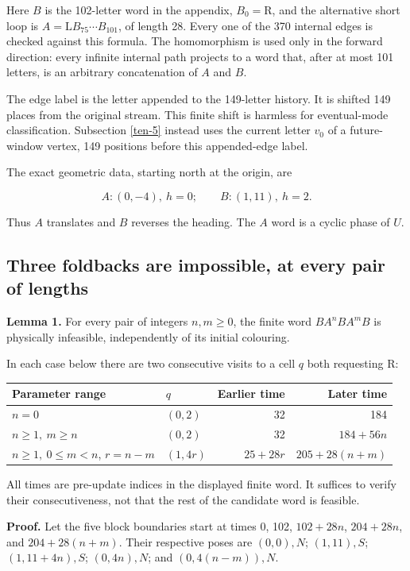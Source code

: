 \documentclass[
  11pt,
]{article}
\begin{document}
Here \(B\) is the 102-letter word in the appendix, \(B_0=\mathrm R\),
and the alternative short loop is \(A=\mathrm L B_{75}\cdots B_{101}\),
of length 28. Every one of the 370 internal edges is checked against
this formula. The homomorphism is used only in the forward direction:
every infinite internal path projects to a word that, after at most 101
letters, is an arbitrary concatenation of \(A\) and \(B\).

The edge label is the letter appended to the 149-letter history. It is
shifted 149 places from the original stream. This finite shift is
harmless for eventual-mode classification. Subsection \ref{ten-5}
instead uses the current letter \(v_0\) of a future-window vertex,
149 positions before this appended-edge label.

The exact geometric data, starting north at the origin, are

\[A:(0,-4),\ h=0;\qquad B:(1,11),\ h=2.\]

Thus \(A\) translates and \(B\) reverses the heading. The \(A\) word is
a cyclic phase of \(U\).

\subsection{Three foldbacks are impossible, at every pair of
lengths}\label{ten-4}

\textbf{Lemma 1.} For every pair of integers \(n,m\ge0\), the finite
word \(B A^n B A^m B\) is physically infeasible, independently of its
initial colouring.

In each case below there are two consecutive visits to a cell \(q\) both
requesting R:

\begin{longtable}[]{@{}llrr@{}}
\toprule\noalign{}
Parameter range & \(q\) & Earlier time & Later time \\
\midrule\noalign{}
\endhead
\bottomrule\noalign{}
\endlastfoot
\(n=0\) & \((0,2)\) & 32 & 184 \\
\(n\ge1,\ m\ge n\) & \((0,2)\) & 32 & \(184+56n\) \\
\(n\ge1,\ 0\le m<n\), \(r=n-m\) & \((1,4r)\) & \(25+28r\) &
\(205+28(n+m)\) \\
\end{longtable}

All times are pre-update indices in the displayed finite word. It
suffices to verify their consecutiveness, not that the rest of the
candidate word is feasible.

\textbf{Proof.} Let the five block boundaries start at times 0, 102,
\(102+28n\), \(204+28n\), and \(204+28(n+m)\). Their respective poses
are \((0,0),N\); \((1,11),S\); \((1,11+4n),S\); \((0,4n),N\); and
\((0,4(n-m)),N\).
\end{document}
